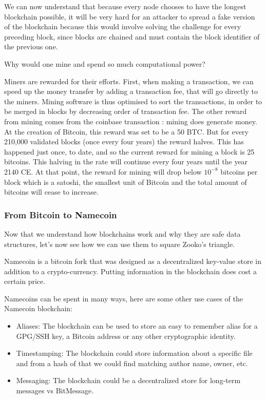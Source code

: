 \documentclass{vldb}
\begin{document}
We can now understand that because every node chooses to have the longest blockchain possible, it will be very hard for an attacker to spread a fake version of the blockchain because this would involve solving the challenge for every preceding block, since blocks are chained and must contain the block identifier of the previous one. 


Why would one mine and spend so much computational power?


Miners are rewarded for their efforts. First, when making a transaction, we can speed up the money transfer by adding a transaction fee, that will go directly to the miners. Mining software is thus optimised to sort the transactions, in order to be merged in blocks by decreasing order of transaction fee. 
The other reward from mining comes from the coinbase transaction : mining does generate money.  At the creation of Bitcoin, this reward was set to be a 50 BTC. But for every 210,000 validated blocks (once every four years) the reward halves. This has happened just once, to date, and so the current reward for mining a block is 25 bitcoins. This halving in the rate will continue every four years until the year 2140 CE. At that point, the reward for mining will drop below $10^{-8}$ bitcoins per block which is a satoshi, the smallest unit of Bitcoin and the total amount of bitcoins will cease to increase.

\subsubsection{From Bitcoin to Namecoin}

Now that we understand how blockchains work and why they are safe data structures, let's now see how we can use them to square Zooko's triangle. 

Namecoin is a bitcoin fork that was designed as a decentralized key-value store in addition to a crypto-currency. Putting information in the blockchain does cost a certain price.

Namecoins can be spent in many ways, here are some other use cases of the Namecoin blockchain:
\begin{itemize}
\item Aliases: The blockchain can be used to store an easy to remember alias for a GPG/SSH key, a Bitcoin address or any other cryptographic identity.
\item Timestamping: The blockchain could store information about a specific file and from a hash of that we could find matching author name, owner, etc.
\item Messaging: The blockchain could be a decentralized store for  long-term messages vs BitMessage.
\end{itemize}
\end{document}
